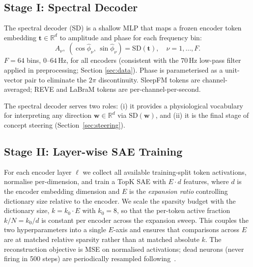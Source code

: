 \documentclass{article}
\begin{document}
\subsection{Stage I: Spectral Decoder}
\label{sec:stage-i}

The spectral decoder (SD) is a shallow MLP that maps a frozen encoder token embedding $\mathbf{t} \in \mathbb{R}^d$ to amplitude and phase for each frequency bin:
\begin{equation}
\hat{A}_\nu,\;(\cos \hat{\phi}_\nu,\, \sin \hat{\phi}_\nu) = \mathrm{SD}(\mathbf{t}),
\quad \nu = 1, \ldots, F.
\label{eq:sd}
\end{equation}
$F = 64$ bins, $0$--$64$\,Hz, for all encoders (consistent with the
$70$\,Hz low-pass filter applied in preprocessing; Section \ref{sec:data}). Phase is parameterised as a unit-vector pair to eliminate the $2\pi$ discontinuity. SleepFM tokens are channel-averaged; REVE and LaBraM tokens are per-channel-per-second.

The spectral decoder serves two roles: (i) it provides a physiological vocabulary for interpreting any direction $\mathbf{w} \in \mathbb{R}^d$ via $\mathrm{SD}(\mathbf{w})$, and (ii) it is the final stage of concept steering (Section~\ref{sec:steering}).

\subsection{Stage II: Layer-wise SAE Training}
\label{sec:stage-ii}

For each encoder layer $\ell$ we collect all available training-split token activations, normalise per-dimension, and train a TopK SAE with $E \cdot d$ features, where $d$ is the encoder embedding dimension and $E$ is the \emph{expansion ratio} controlling dictionary size relative to the encoder. We scale the sparsity budget with the dictionary size, $k = k_0 \cdot E$ with $k_0 = 8$, so that the per-token active fraction $k / N = k_0 / d$ is constant per encoder across the expansion sweep. This couples the two hyperparameters into a single $E$-axis and ensures that comparisons across $E$ are at matched relative sparsity rather than at matched absolute $k$. The reconstruction objective is MSE on normalised activations; dead neurons (never firing in 500 steps) are periodically resampled following~\cite{templeton2024scaling}. 

\end{document}
